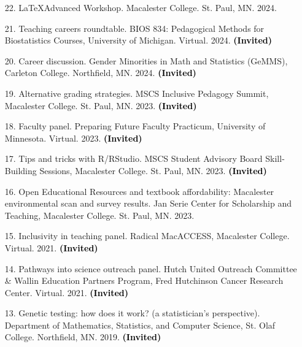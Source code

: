 \documentclass[margin]{res}
\newenvironment{benumerate}[1]{
    \let\oldItem\item
    \def\item{\addtocounter{enumi}{-2}\oldItem}
    
    \begin{enumerate}
    \setcounter{enumi}{#1}
    \addtocounter{enumi}{1}
}{
    \end{enumerate}
}
\newcommand{\annotate}[1]{\textcolor{black}{\textbf{(#1)}}}
\begin{document}
\begin{resume}
\begin{itemize}

\item[22.] %
\LaTeX Advanced Workshop. 
Macalester College. St. Paul, MN. 2024. %

\item[21.] Teaching careers roundtable. 
BIOS 834: Pedagogical Methods for Biostatistics Courses, University of Michigan.  Virtual.  2024. 
\annotate{Invited}

\item[20.] Career discussion. 
Gender Minorities in Math and Statistics (GeMMS), Carleton College. Northfield, MN. 2024. 
\annotate{Invited}

\item[19.] Alternative grading strategies. 
MSCS Inclusive Pedagogy Summit, Macalester College. St. Paul, MN. 2023.  
\annotate{Invited}

\item[18.] Faculty panel.  
Preparing Future Faculty Practicum, University of Minnesota. Virtual. 2023. 
\annotate{Invited}

\item[17.] Tips and tricks with R/RStudio.  
MSCS Student Advisory Board Skill-Building Sessions, Macalester College. St. Paul, MN. 2023. 
\annotate{Invited}

\item[16.] Open Educational Resources and textbook affordability: Macalester environmental scan and survey results.  
Jan Serie Center for Scholarship and Teaching, Macalester College. St. Paul, MN. 2023.


\item[15.] Inclusivity in teaching panel. 
Radical MacACCESS, Macalester College. Virtual. 2021. 
\annotate{Invited}

\item[14.] Pathways into science outreach panel. 
Hutch United Outreach Committee \& Wallin Education Partners Program, Fred Hutchinson Cancer Research Center. Virtual. 2021. 
\annotate{Invited}

\item[13.] Genetic testing: how does it work? (a statistician's perspective). 
Department of Mathematics, Statistics, and Computer Science, St. Olaf College. Northfield, MN. 2019. 
\annotate{Invited}


\end{itemize}
\end{resume}
\end{document}
